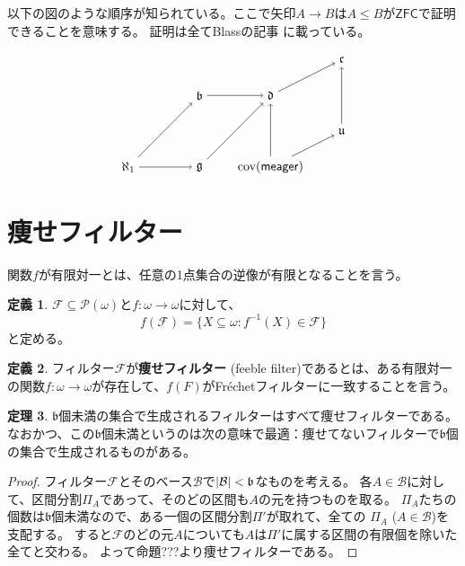 \documentclass[uplatex]{jsarticle}
\newcommand{\frakb}{\mathfrak{b}}
\newcommand{\frakd}{\mathfrak{d}}
\newcommand{\frakc}{\mathfrak{c}}
\newcommand{\frakg}{\mathfrak{g}}
\newcommand{\fraku}{\mathfrak{u}}
\newcommand{\Pow}{\mathcal{P}}
\newcommand{\cov}{\operatorname{cov}}
\newcommand{\meager}{\mathsf{meager}}
\newcommand{\ZFC}{\mathsf{ZFC}}
\DeclarePairedDelimiter\abs{\lvert}{\rvert}
\renewcommand\subset{\subseteq}
\theoremstyle{definition}
\newtheorem{thm}{定理}[section]
\newtheorem{defi}[thm]{定義}
\begin{document}
	以下の図のような順序が知られている。ここで矢印$A \to B$は$A \le B$が$\ZFC$で証明できることを意味する。
	証明は全てBlassの記事 \cite{blass2010combinatorial}に載っている。
	
	\[
	\tikz{
		\node (aleph1) at (-2, -2) {$\aleph_1$};
		\node (b) at (0, 0) {$\frakb$};
		\node (d) at (2, 0) {$\frakd$};
		\node (covm) at (2, -2) {$\cov(\meager)$};
		\node (g) at (0, -2) {$\frakg$};
		\node (u) at (4, -1) {$\fraku$};
		\node (c) at (4, 1) {$\frakc$};
		
		\draw[->] (aleph1) -- (b);
		\draw[->] (aleph1) -- (g);
		\draw[->] (b) -- (d);
		\draw[->] (covm) -- (d);
		\draw[->] (g) -- (d);
		\draw[->] (covm) -- (u);
		\draw[->] (d) -- (c);
		\draw[->] (u) -- (c);
	}
	\]
	
	\section{痩せフィルター}
	
	関数$f$が有限対一とは、任意の1点集合の逆像が有限となることを言う。
	
	\begin{defi}
		$\mathcal{F} \subset \Pow(\omega)$と$f \colon \omega \to \omega$に対して、
		\[
		f(\mathcal{F}) = \{ X \subset \omega : f^{-1}(X) \in \mathcal{F} \}
		\]
		と定める。
	\end{defi}
	
	\begin{defi}
		フィルター$\mathcal{F}$が\textbf{痩せフィルター} (feeble filter)であるとは、ある有限対一の関数$f \colon \omega \to \omega$が存在して、$f(F)$がFréchetフィルターに一致することを言う。
	\end{defi}
	
	\begin{thm}
			$\frakb$個未満の集合で生成されるフィルターはすべて痩せフィルターである。なおかつ、この$\frakb$個未満というのは次の意味で最適：痩せてないフィルターで$\frakb$個の集合で生成されるものがある。
	\end{thm}
	\begin{proof}
		フィルター$\mathcal{F}$とそのベース$\mathcal{B}$で$\abs{\mathcal{B}} < \frakb$なものを考える。
		各$A \in \mathcal{B}$に対して、区間分割$\Pi_A$であって、そのどの区間も$A$の元を持つものを取る。
		$\Pi_A$たちの個数は$\frakb$個未満なので、ある一個の区間分割$\Pi'$が取れて、全ての $\Pi_A$ ($A \in \mathcal{B}$)を支配する。
		すると$\mathcal{F}$のどの元$A$についても$A$は$\Pi'$に属する区間の有限個を除いた全てと交わる。
		よって命題???より痩せフィルターである。
	\end{proof}

\nocite{*}
\printbibliography[title={参考文献}]


	
\end{document}
